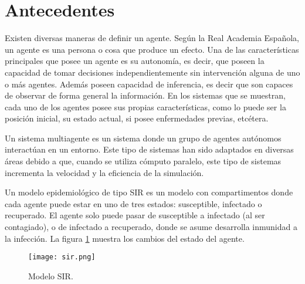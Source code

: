 \documentclass[final,6p,times,twocolumn]{elsarticle}
\begin{document}





\section{Antecedentes}
Existen diversas maneras de definir un agente. Según la Real Academia Española, un agente es una persona o cosa que produce un efecto. Una de las características principales que posee un agente es su autonomía, es decir, que poseen la capacidad de tomar decisiones independientemente sin intervención alguna de uno o más agentes. Además poseen capacidad de inferencia, es decir que son capaces de observar de forma general la información. En los sistemas que se muestran, cada uno de los agentes \cite{introductionmas} posee sus propias características, como lo puede ser la posición inicial, su estado actual, si posee enfermedades previas, etcétera.   

Un sistema multiagente \cite{surveymas} es un sistema donde un grupo de agentes autónomos interactúan en un entorno. Este tipo de sistemas han sido adaptados en diversas áreas debido a que, cuando se utiliza cómputo paralelo, este tipo de sistemas incrementa la velocidad y la eficiencia de la simulación.

Un modelo epidemiológico de tipo SIR es un modelo con compartimentos donde cada agente puede estar en uno de tres estados: susceptible, infectado o recuperado. El agente solo puede pasar de susceptible a infectado (al ser contagiado), o de infectado a recuperado, donde se asume desarrolla inmunidad a la infección. La figura \ref{sir} muestra los cambios del estado del agente.
\begin{figure}
\label{sir}
\centering
\texttt{[image: sir.png]}
\caption{Modelo SIR.}
\end{figure}





\label{S:2}




\end{document}
